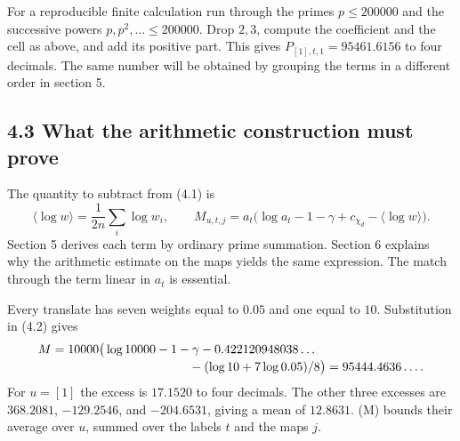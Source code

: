 \documentclass[11pt,letterpaper]{article}
\begin{document}
{For a reproducible finite calculation run through the primes $p\le200000$ and the successive powers $p,p^2,\ldots\le200000$. Drop $2,3$, compute the coefficient and the cell as above, and add its positive part. This gives $P_{[1],t,1}=95461.6156$ to four decimals. The same number will be obtained by grouping the terms in a different order in section 5.

\newpage
\subsection*{4.3 What the arithmetic construction must prove}

The quantity to subtract from (4.1) is
\begin{equation}\label{D:54}
 \langle\log w\rangle=\frac{1}{2n}\sum_i\log w_i,\qquad
 M_{u,t,j}=a_t\big(\log a_t-1-\gamma+c_{\chi_d}-\langle\log w\rangle\big).
                                                                 \tag{4.2}
\end{equation}
Section 5 derives each term by ordinary prime summation. Section 6 explains why the arithmetic estimate on the maps yields the same expression. The match through the term linear in $a_t$ is essential.

Every translate has seven weights equal to $0.05$ and one equal to $10$. Substitution in (4.2) gives
\begin{equation}\label{D:55}
 \begin{aligned}
 M&=10000\big(\log 10000-1-\gamma-0.422120948038\ldots\\[-2pt]
 &\hspace{39mm}-(\log 10+7\log 0.05)/8\big)=95444.4636\ldots .
 \end{aligned}
\end{equation}
For $u=[1]$ the excess is $17.1520$ to four decimals. The other three excesses are $368.2081$, $-129.2546$, and $-204.6531$, giving a mean of $12.8631$. (M) bounds their average over $u$, summed over the labels $t$ and the maps $j$.

}
\end{document}
